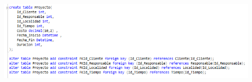 \documentclass[12pt,letterpaper]{article}
\begin{document}
\begin{itemize}
\begin{center}
	\includegraphics[width=14cm]{./Imagenes/s3-2}
	\end{center}

\end{itemize}
\end{document}
